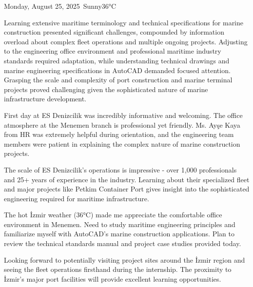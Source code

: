 \begin{dailyentry}{Monday, August 25, 2025}{\weathersunny\ Sunny}{36°C}
\begin{challenges}
\item[] Learning extensive maritime terminology and technical specifications for marine construction presented significant challenges, compounded by information overload about complex fleet operations and multiple ongoing projects. Adjusting to the engineering office environment and professional maritime industry standards required adaptation, while understanding technical drawings and marine engineering specifications in AutoCAD demanded focused attention. Grasping the scale and complexity of port construction and marine terminal projects proved challenging given the sophisticated nature of marine infrastructure development.
\end{challenges}

\begin{dailynotes}
First day at ES Denizcilik was incredibly informative and welcoming. The office atmosphere at the Menemen branch is professional yet friendly. Ms. Ayşe Kaya from HR was extremely helpful during orientation, and the engineering team members were patient in explaining the complex nature of marine construction projects.

The scale of ES Denizcilik's operations is impressive - over 1,000 professionals and 25+ years of experience in the industry. Learning about their specialized fleet and major projects like Petkim Container Port gives insight into the sophisticated engineering required for maritime infrastructure.

The hot İzmir weather (36°C) made me appreciate the comfortable office environment in Menemen. Need to study maritime engineering principles and familiarize myself with AutoCAD's marine construction applications. Plan to review the technical standards manual and project case studies provided today.

Looking forward to potentially visiting project sites around the İzmir region and seeing the fleet operations firsthand during the internship. The proximity to İzmir's major port facilities will provide excellent learning opportunities.
\end{dailynotes}

\begin{approvalsection}
\end{approvalsection}

\end{dailyentry}
